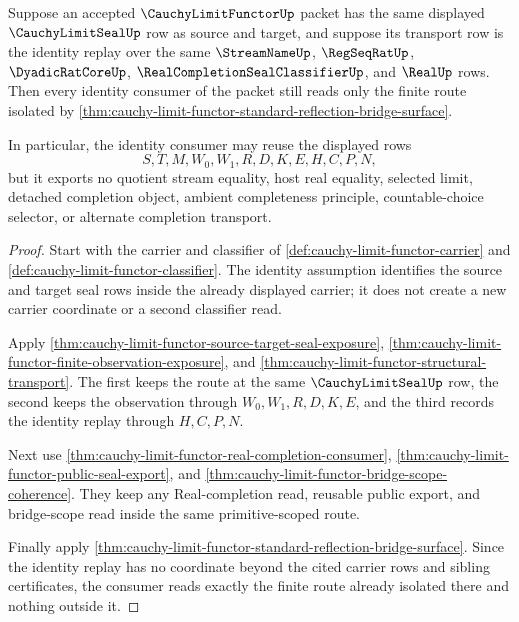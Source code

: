 \begin{theorem}
\label{thm:cauchy-limit-functor-identity-consumer}
Suppose an accepted $\CauchyLimitFunctorUp$ packet has the same displayed $\CauchyLimitSealUp$ row as source and target, and suppose its transport row is the identity replay over the same $\StreamNameUp$, $\RegSeqRatUp$, $\DyadicRatCoreUp$, $\RealCompletionSealClassifierUp$, and $\RealUp$ rows. Then every identity consumer of the packet still reads only the finite route isolated by \autoref{thm:cauchy-limit-functor-standard-reflection-bridge-surface}.

In particular, the identity consumer may reuse the displayed rows
$$
S,T,M,W_0,W_1,R,D,K,E,H,C,P,N,
$$
but it exports no quotient stream equality, host real equality, selected limit, detached completion object, ambient completeness principle, countable-choice selector, or alternate completion transport.
\end{theorem}
\begin{proof}
Start with the carrier and classifier of \autoref{def:cauchy-limit-functor-carrier} and \autoref{def:cauchy-limit-functor-classifier}. The identity assumption identifies the source and target seal rows inside the already displayed carrier; it does not create a new carrier coordinate or a second classifier read.

Apply \autoref{thm:cauchy-limit-functor-source-target-seal-exposure}, \autoref{thm:cauchy-limit-functor-finite-observation-exposure}, and \autoref{thm:cauchy-limit-functor-structural-transport}. The first keeps the route at the same $\CauchyLimitSealUp$ row, the second keeps the observation through $W_0,W_1,R,D,K,E$, and the third records the identity replay through $H,C,P,N$.

Next use \autoref{thm:cauchy-limit-functor-real-completion-consumer}, \autoref{thm:cauchy-limit-functor-public-seal-export}, and \autoref{thm:cauchy-limit-functor-bridge-scope-coherence}. They keep any Real-completion read, reusable public export, and bridge-scope read inside the same primitive-scoped route.

Finally apply \autoref{thm:cauchy-limit-functor-standard-reflection-bridge-surface}. Since the identity replay has no coordinate beyond the cited carrier rows and sibling certificates, the consumer reads exactly the finite route already isolated there and nothing outside it.
\end{proof}

